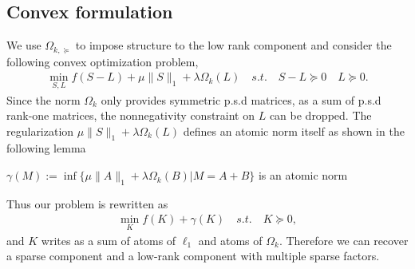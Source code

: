 \subsection{Convex formulation}

We use $\Omega_{k,\succeq}$ to impose structure to the low rank component and consider the following convex optimization problem,
\begin{align}
\label{opt}
\min_{S,L} f(S-L)+\mu\|S\|_{1}+\lambda\Omega_k(L) \quad s.t. \quad S-L \succeq 0 \quad L \succeq 0.
\end{align}
Since the norm $\Omega_k$ only provides symmetric p.s.d matrices, as a sum of p.s.d rank-one matrices, the nonnegativity constraint on $L$ can be dropped. The regularization $\mu\|S\|_{1}+\lambda\Omega_k(L)$ defines an atomic norm itself as shown in the following lemma

\begin{lemm} $\gamma(M):=\inf\{\mu\|A\|_{1}+\lambda\Omega_k(B)|M=A+B\}$ is an atomic norm
\end{lemm}
Thus our problem is rewritten as
\begin{align}
\label{opt_at}
\min_{K} f(K)+ \gamma(K) \quad s.t. \quad K \succeq 0,
\end{align}
and $K$ writes as a sum of atoms of $\ell_1$ and atoms of $\Omega_k$. Therefore we can recover a sparse component and a low-rank component with multiple sparse factors.\\

